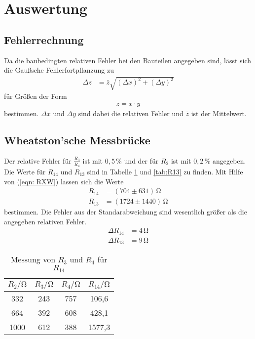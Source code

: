 \section{Auswertung}
\label{sec:Auswertung}
\subsection{Fehlerrechnung}
Da die baubedingten relativen Fehler bei den Bauteilen angegeben sind, lässt sich die Gaußsche Fehlerfortpflanzung zu
\begin{align}
  \Delta z &= \bar{z}\sqrt{(\Delta x)^2 + (\Delta y)^2}
\end{align}
für Größen der Form
\begin{align*}
  z = x \cdot y
\end{align*}
bestimmen. $\Delta x$ und $\Delta y$ sind dabei die relativen Fehler und $\bar{z}$ ist der Mittelwert.

\subsection{Wheatston'sche Messbrücke}
Der relative Fehler für $\frac{R_3}{R_4}$ ist mit $0,5\,\%$ und der für $R_2$ ist mit $0,2\,\%$ angegeben. Die Werte für $R_{14}$ und $R_{13}$ sind in
Tabelle \ref{tab:R14} und \ref{tab:R13} zu finden. Mit Hilfe von (\ref{eqn: RXW}) lassen sich die Werte
\begin{align*}
  R_{14} &= (704 \pm 631)\,\unit{\ohm} \\
  R_{13} &= (1724 \pm 1440)\,\unit{\ohm}
\end{align*}
bestimmen. Die Fehler aus der Standarabweichung sind wesentlich größer als die angegeben relativen Fehler.
\begin{align*}
  \Delta R_{14} &= 4\,\unit{\ohm} \\
  \Delta R_{13} &= 9\,\unit{\ohm}
\end{align*}

\begin{table}
  \centering
  \caption{Messung von $R_3$ und $R_4$ für $R_{14}$}
  \label{tab:R14}
  \begin{tabular}{c c c c}
    \toprule
    $R_2/\unit{\ohm}$ & $R_3/\unit{\ohm}$ & $R_4/\unit{\ohm}$ & $R_{14}/\unit{\ohm}$ \\
    \midrule
     332 & 243 & 757 &  106,6 \\
     664 & 392 & 608 &  428,1 \\
    1000 & 612 & 388 & 1577,3 \\
    \bottomrule
  \end{tabular}
\end{table}

